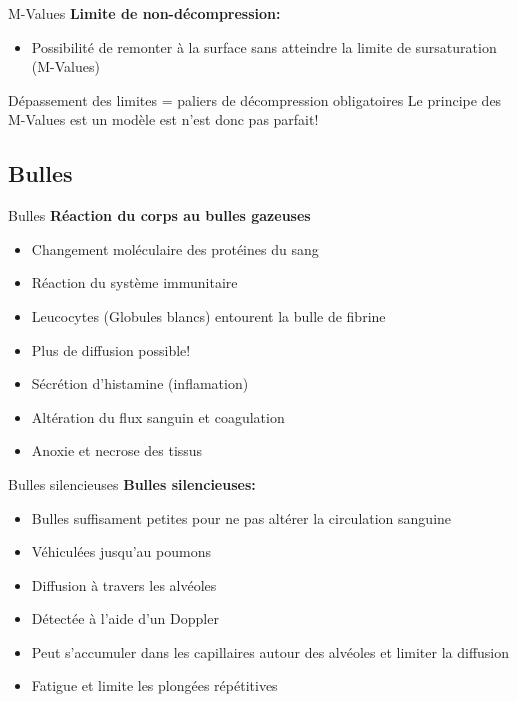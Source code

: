 \begin{frame}{M-Values}
	\textbf{Limite de non-décompression:}
	\begin{itemize}
		\item Possibilité de remonter à la surface sans atteindre la limite de sursaturation (M-Values)
	\end{itemize}
	\vfill
	Dépassement des limites = paliers de décompression obligatoires
	\vfill
	Le principe des M-Values est un modèle est n'est donc pas parfait!
\end{frame}

\subsection{Bulles}
\begin{frame}{Bulles}
	\textbf{Réaction du corps au bulles gazeuses}
	\begin{itemize}
		\item Changement moléculaire des protéines du sang
		\item Réaction du système immunitaire
		\item Leucocytes (Globules blancs) entourent la bulle de fibrine
		\item Plus de diffusion possible!
		\item Sécrétion d'histamine (inflamation)
		\item Altération du flux sanguin et coagulation
		\item Anoxie et necrose des tissus
	\end{itemize}
\end{frame}

\begin{frame}{Bulles silencieuses}  
	\textbf{Bulles silencieuses:}
	\begin{itemize}
		\item Bulles suffisament petites pour ne pas altérer la circulation sanguine
		\item Véhiculées jusqu'au poumons
		\item Diffusion à travers les alvéoles
		\item Détectée à l'aide d'un Doppler
		\item Peut s'accumuler dans les capillaires autour des alvéoles et limiter la diffusion
		\item Fatigue et limite les plongées répétitives
	\end{itemize}
\end{frame}

